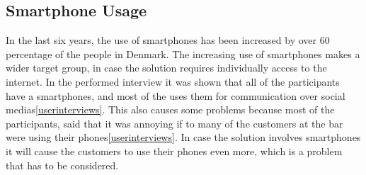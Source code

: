 \subsection{Smartphone Usage}
\label{sub:smartphone_usage}

In the last six years, the use of smartphones has been increased by over 60 percentage of the people in Denmark\cite{danmarksStatestkSmartphone}. The increasing use of smartphones makes a wider target group, in case the solution requires individually access to the internet. In the performed interview it was shown that all of the participants have a smartphones, and most of the uses them for communication over social medias\cref{userinterviews}. This also causes some problems because most of the participants, said that it was annoying if to many of the customers at the bar were using their phones\cref{userinterviews}. In case the solution involves smartphones it will cause the customers to use their phones even more, which is a problem that has to be considered. 
